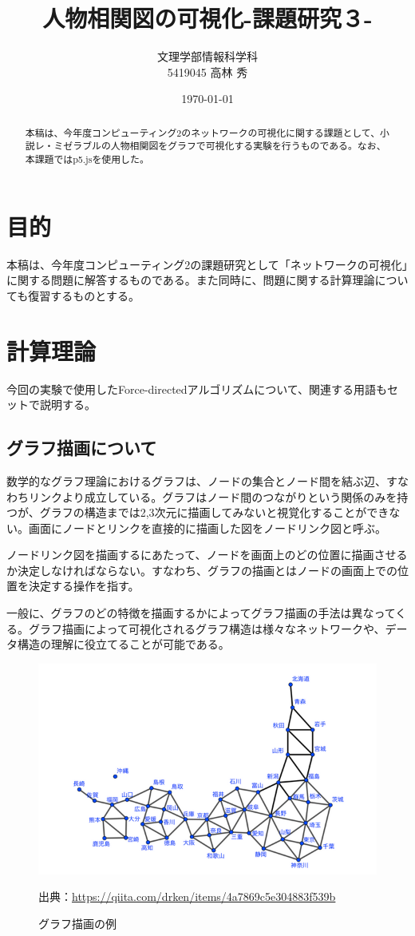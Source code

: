 \documentclass[dvipdfmx]{jsarticle}
\title{人物相関図の可視化-課題研究３-}
\author{文理学部情報科学科\\5419045 高林 秀}
\date{\today}
\begin{document}
\maketitle

\begin{abstract}
本稿は、今年度コンピューティング2のネットワークの可視化に関する課題として、小説レ・ミゼラブルの人物相関図をグラフで可視化する実験を行うものである。なお、本課題ではp5.jsを使用した。
\end{abstract}

\section{目的}
本稿は、今年度コンピューティング2の課題研究として「ネットワークの可視化」に関する問題に解答するものである。また同時に、問題に関する計算理論についても復習するものとする。
\section{計算理論}
今回の実験で使用したForce-directedアルゴリズムについて、関連する用語もセットで説明する。
\subsection{グラフ描画について}
数学的なグラフ理論におけるグラフは、ノードの集合とノード間を結ぶ辺、すなわちリンクより成立している。グラフはノード間のつながりという関係のみを持つが、グラフの構造までは2,3次元に描画してみないと視覚化することができない。画面にノードとリンクを直接的に描画した図をノードリンク図と呼ぶ。\par
ノードリンク図を描画するにあたって、ノードを画面上のどの位置に描画させるか決定しなければならない。すなわち、グラフの描画とはノードの画面上での位置を決定する操作を指す。\par
一般に、グラフのどの特徴を描画するかによってグラフ描画の手法は異なってくる。グラフ描画によって可視化されるグラフ構造は様々なネットワークや、データ構造の理解に役立てることが可能である。
\begin{figure}[H]
  \centering
  \includegraphics[scale=0.6]{images/graph_img.png}
  \caption{グラフ描画の例}
  出典：\url{https://qiita.com/drken/items/4a7869c5e304883f539b}
\end{figure}
\end{document}
